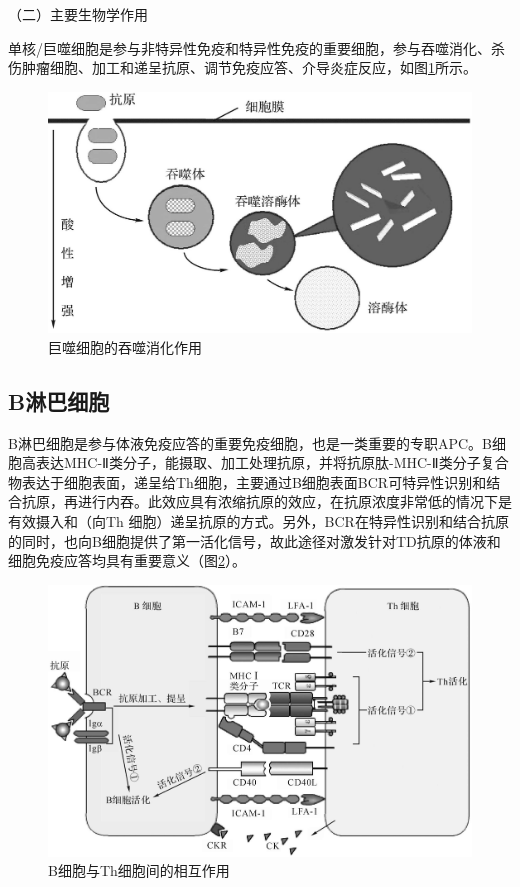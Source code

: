 （二）主要生物学作用

单核/巨噬细胞是参与非特异性免疫和特异性免疫的重要细胞，参与吞噬消化、杀伤肿瘤细胞、加工和递呈抗原、调节免疫应答、介导炎症反应，如图\ref{fig9-5}所示。

\begin{figure}[!htbp]
 \centering
 \includegraphics{./images/Image00131.jpg}
 \captionsetup{justification=centering}
 \caption{巨噬细胞的吞噬消化作用}
 \label{fig9-5}
  \end{figure} 


\subsection{B淋巴细胞}

B淋巴细胞是参与体液免疫应答的重要免疫细胞，也是一类重要的专职APC。B细胞高表达MHC-Ⅱ类分子，能摄取、加工处理抗原，并将抗原肽-MHC-Ⅱ类分子复合物表达于细胞表面，递呈给Th细胞，主要通过B细胞表面BCR可特异性识别和结合抗原，再进行内吞。此效应具有浓缩抗原的效应，在抗原浓度非常低的情况下是有效摄入和（向Th
细胞）递呈抗原的方式。另外，BCR在特异性识别和结合抗原的同时，也向B细胞提供了第一活化信号，故此途径对激发针对TD抗原的体液和细胞免疫应答均具有重要意义（图\ref{fig9-6}）。

\begin{figure}[!htbp]
 \centering
 \includegraphics[width=.6\textwidth]{./images/Image00132.jpg}
 \captionsetup{justification=centering}
 \caption{B细胞与Th细胞间的相互作用}
 \label{fig9-6}
  \end{figure} 

